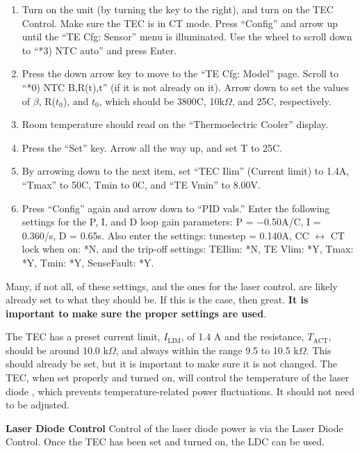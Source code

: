 \documentclass{../lab}
\begin{document}
\begin{enumerate}
    \item Turn on the unit (by turning the key to the right), and turn on the TEC Control. Make sure the TEC is in CT mode. Press ``Config'' and arrow up until the ``TE Cfg: Sensor'' menu is illuminated. Use the wheel to scroll down to ``*3) NTC auto'' and press Enter.

    \item Press the down arrow key to move to the ``TE Cfg: Model'' page. Scroll to ``*0) NTC B,R(t),t'' (if it is not already on it). Arrow down to set the values of $\beta$, R($t_0$), and $t_0$, which should be 3800C, 10k$\Omega$, and 25C, respectively.

    \item Room temperature should read on the ``Thermoelectric Cooler'' display.

    \item Press the ``Set'' key. Arrow all the way up, and set T to 25C.

    \item By arrowing down to the next item, set ``TEC Ilim'' (Current limit) to 1.4A, ``Tmax'' to 50C, Tmin to 0C, and ``TE Vmin'' to 8.00V.

    \item Press ``Config'' again and arrow down to ``PID vals.'' Enter the following settings for the P, I, and D loop gain parameters: P = $-$0.50A/C, I = 0.360/s, D = 0.65s. Also enter the settings: tunestep = 0.140A, CC $\leftrightarrow$ CT lock when on: *N, and the trip-off settings: TEIlim: *N, TE Vlim: *Y, Tmax: *Y, Tmin: *Y, SenseFault: *Y.
\end{enumerate}

Many, if not all, of these settings, and the ones for the laser control, are likely already set to what they should be. If this is the case, then great. \textbf{It is important to make sure the proper settings are used}.

The TEC has a preset current limit, $I_\text{LIM}$, of 1.4 A and the resistance, $T_\text{ACT}$, should be around 10.0 k$\Omega$, and always within the range 9.5 to 10.5 k$\Omega$. This should already be set, but it is important to make sure it is not changed. The TEC, when set properly and turned on, will control the temperature of the laser diode , which prevents temperature-related power fluctuations. It should not need to be adjusted.

\textbf{Laser Diode Control} Control of the laser diode power is via the Laser Diode Control. Once the TEC has been set and turned on, the LDC can be used.
\end{document}
